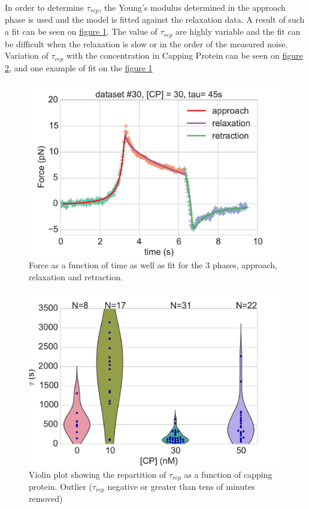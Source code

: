 \documentclass[A4paperpaper,11pt,english]{sphinxmanual}
\begin{document}
In order to determine \(\tau_{rep}\), the Young's modulus determined in the
approach phase is used and the model is fitted against the relaxation data.  A
result of such a fit can be seen on \hyperref[index-latex:fit-3-phases]{figure  \ref*{index-latex:fit-3-phases}}. The value of
\(\tau_{rep}\) are highly variable and the fit can be difficult when the relaxation is
slow or in the order of the measured noise. Variation of \(\tau_{rep}\) with the
concentration in Capping Protein can be seen on \hyperref[index-latex:tau-violin]{figure  \ref*{index-latex:tau-violin}}, and
one example of fit on the \hyperref[index-latex:fit-3-phases]{figure  \ref*{index-latex:fit-3-phases}}
\begin{figure}[htbp]
\centering
\capstart

\includegraphics[width=0.800\linewidth]{3phases.pdf}
\caption{Force as a function of time as well as fit for the 3 phases, approach,
relaxation and retraction.}\label{index-latex:fit-3-phases}\end{figure}
\begin{figure}[htbp]
\centering
\capstart

\includegraphics[width=0.800\linewidth]{tau_violin.pdf}
\caption{Violin plot showing the repartition of \(\tau_{rep}\) as a function of capping
protein. Outlier (\(\tau_{rep}\) negative or greater than tens of minutes removed)}\label{index-latex:tau-violin}\end{figure}
\end{document}
